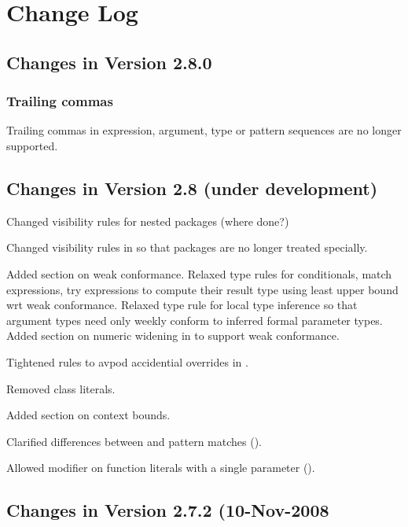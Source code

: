 
\chapter{Change Log}

\section*{Changes in Version 2.8.0}

\subsection*{Trailing commas}
Trailing commas in expression, argument, type or pattern sequences are no
longer supported.

\section*{Changes in Version 2.8 (under development)}

Changed visibility rules for nested packages (where done?)

Changed visibility rules in  so that packages are no
longer treated specially.

Added section  on weak conformance. Relaxed
type rules for conditionals, match expressions, try expressions to
compute their result type using least upper bound wrt weak
conformance. Relaxed type rule for local type inference so that
argument types need only weekly conform to inferred formal parameter
types. Added section on numeric widening in  to
support weak conformance.

Tightened rules to avpod accidential overrides in
.

Removed class literals.

Added section  on context bounds.

Clarified differences between  and pattern matches
().

Allowed  modifier on function literals with a single
parameter ().


\section*{Changes in Version 2.7.2 (10-Nov-2008}

